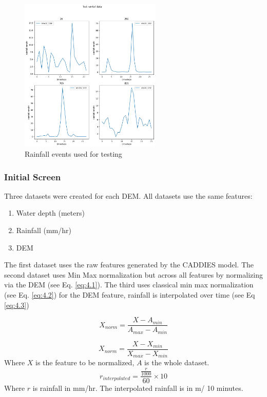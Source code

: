 \begin{figure}[htbp]
	\includegraphics[width=0.6\textwidth]{../Figures/test_rainfall_events.png}
	\centering
	\caption[Rainfall Test]{Rainfall events used for testing} 
	\label{fig:4.4}
\end{figure}

\subsubsection*{Initial Screen}
Three datasets were created for each DEM. All datasets use the same features:
\begin{enumerate}
	\item Water depth (meters)
	\item Rainfall (mm/hr)
	\item DEM
\end{enumerate}

The first dataset uses the raw features generated by the CADDIES model. The second dataset uses Min Max normalization but across all features by normalizing via the DEM (see Eq. \ref{eq:4.1}). The third uses classical min max normalization (see Eq. \ref{eq:4.2}) for the DEM feature, rainfall is interpolated over time (see Eq \ref{eq:4.3})

\begin{equation}
	\label{eq:4.1}
	X_{norm} = \frac{X-A_{min}}{A_{max}-A_{min}}
\end{equation}

\begin{equation}
	\label{eq:4.2}
	X_{norm} = \frac{X-X_{min}}{X_{max}-X_{min}}
\end{equation}
Where $X$ is the feature to be normalized, $A$ is the whole dataset.
\begin{equation}
	\label{eq:4.3}
	r_{interpolated} = \frac{\frac{r}{1000}}{60} \times 10
\end{equation}
Where $r$ is rainfall in mm/hr. The interpolated rainfall is in m/ 10 minutes.

